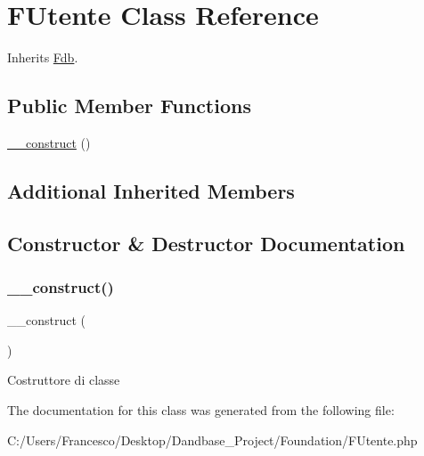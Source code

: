 \hypertarget{class_f_utente}{}\section{F\+Utente Class Reference}
\label{class_f_utente}


Inherits \mbox{\hyperlink{class_fdb}{Fdb}}.

\subsection*{Public Member Functions}
\begin{DoxyCompactItemize}
\item 
\mbox{\hyperlink{class_f_utente_a095c5d389db211932136b53f25f39685}{\+\_\+\+\_\+construct}} ()
\end{DoxyCompactItemize}
\subsection*{Additional Inherited Members}


\subsection{Constructor \& Destructor Documentation}
\mbox{\label{class_f_utente_a095c5d389db211932136b53f25f39685}} 
\subsubsection{\texorpdfstring{\+\_\+\+\_\+construct()}{\_\_construct()}}
{\footnotesize\ttfamily \+\_\+\+\_\+construct (\begin{DoxyParamCaption}{ }\end{DoxyParamCaption})}

Costruttore di classe 

The documentation for this class was generated from the following file\+:\begin{DoxyCompactItemize}
\item 
C\+:/\+Users/\+Francesco/\+Desktop/\+Dandbase\+\_\+\+Project/\+Foundation/F\+Utente.\+php\end{DoxyCompactItemize}
